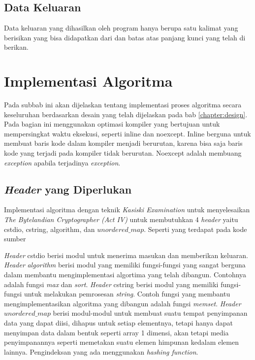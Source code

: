 \subsection{Data Keluaran}
Data keluaran yang dihasilkan oleh program hanya berupa satu kalimat yang berisikan \plaintext yang bisa didapatkan dari \ciphertext dan batas atas panjang kunci yang telah di berikan.

\section{Implementasi Algoritma}
Pada subbab ini akan dijelaskan tentang implementasi proses
algoritma secara keseluruhan berdasarkan desain yang telah
dijelaskan pada bab \ref{chapter:design}. Pada bagian ini menggunakan optimasi kompiler yang bertujuan untuk mempersingkat waktu eksekusi, seperti inline dan noexcept. Inline berguna untuk membuat baris kode dalam kompiler menjadi berurutan, karena bisa saja baris kode yang terjadi pada kompiler tidak berurutan. Noexcept adalah membuang  \textit{exception} apabila terjadinya \textit{exception}.

\subsection{\textit{Header} yang Diperlukan}
Implementasi algoritma dengan teknik \textit{Kasiski Examination} untuk menyelesaikan \textit{The Bytelandian Cryptographer (Act IV)} untuk membutuhkan 4 \textit{header} yaitu cstdio, cstring, algorithm, dan $unordered\_map$. Seperti yang terdapat pada kode sumber



\textit{Header} cstdio berisi modul untuk menerima masukan dan
memberikan keluaran. \textit{Header} \textit{algorithm} berisi modul yang memiliki fungsi-fungsi yang sangat berguna dalam membantu mengimplementasi algortima yang telah dibangun. Contohnya adalah fungsi \textit{max} dan \textit{sort}. \textit{Header} cstring berisi modul yang memiliki fungsi-fungsi untuk melakukan pemrosesan \textit{string}. Contoh fungsi yang membantu mengimplementasikan algoritma yang dibangun adalah fungsi \textit{memset}. \textit{Header} \textit{$unordered\_map$} berisi modul-modul untuk membuat suatu tempat penyimpanan data yang dapat diisi, dihapus untuk setiap elementnya, tetapi hanya dapat menyimpan data dalam bentuk seperti array 1 dimensi, akan tetapi media penyimpanannya seperti memetakan suatu elemen himpunan kedalam elemen lainnya. Pengindeksan yang ada menggunakan \textit{hashing function}.


